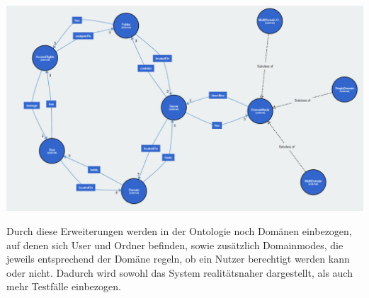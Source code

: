 \begin{center}
    \includegraphics[width=1\textwidth]{Thesis/Images/OntologyBig.png}
\end{center}

Durch diese Erweiterungen werden in der Ontologie noch Domänen einbezogen, auf denen sich User und Ordner befinden, sowie zusätzlich Domainmodes, die jeweils entsprechend der Domäne regeln, ob ein Nutzer berechtigt werden kann oder nicht. Dadurch wird sowohl das System realitätsnaher dargestellt, als auch mehr Testfälle einbezogen.
